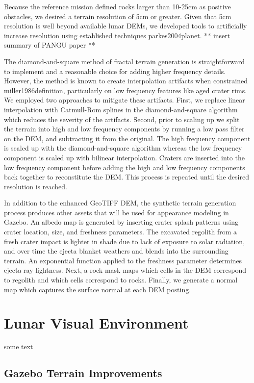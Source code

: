 \documentclass[twocolumn,letterpaper]{IEEEAerospaceCLS}  %
\begin{document}
Because the reference mission defined rocks larger than 10-25cm as positive obstacles, we desired a terrain resolution of 5cm or greater. Given that 5cm resolution is well beyond available lunar DEMs, we developed tools to artificially increase resolution using established techniques {parkes2004planet}. ** insert summary of PANGU paper **

The diamond-and-square method of fractal terrain generation is straightforward to implement and a reasonable choice for adding higher frequency details. However, the method is known to create interpolation artifacts when constrained {miller1986definition}, particularly on low frequency features like aged crater rims. We employed two approaches to mitigate these artifacts. First, we replace linear interpolation with Catmull-Rom splines in the diamond-and-square algorithm which reduces the severity of the artifacts. Second, prior to scaling up we split the terrain into high and low frequency components by running a low pass filter on the DEM, and subtracting it from the original. The high frequency component is scaled up with the diamond-and-square algorithm whereas the low frequency component is scaled up with bilinear interpolation. Craters are inserted into the low frequency component before adding the high and low frequency components back together to reconstitute the DEM. This process is repeated until the desired resolution is reached. 

In addition to the enhanced GeoTIFF DEM, the synthetic terrain generation process produces other assets that will be used for appearance modeling in Gazebo. An albedo map is generated by inserting crater splash patterns using crater location, size, and freshness parameters. The excavated regolith from a fresh crater impact is lighter in shade due to lack of exposure to solar radiation, and over time the ejecta blanket weathers and blends into the surrounding terrain. An exponential function applied to the freshness parameter determines ejecta ray lightness. Next, a rock mask maps which cells in the DEM correspond to regolith and which cells correspond to rocks. Finally, we generate a normal map which captures the surface normal at each DEM posting. 



\section{Lunar Visual Environment}
some text

\subsection{Gazebo Terrain Improvements}
\end{document}

